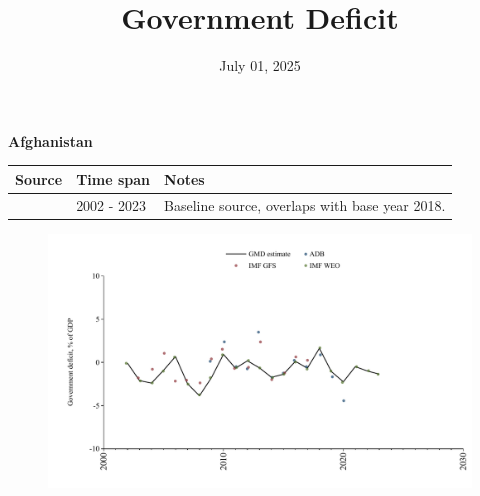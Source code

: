 \documentclass[12pt,a4paper,landscape]{article}
\begin{document}
\title{\Large Government Deficit}
\date{July 01, 2025}
\maketitle
\thispagestyle{empty}

\clearpage
\setcounter{page}{1}
\hypersetup{colorlinks=true,linkcolor=blue,linktoc=all}
\label{toc}
\tableofcontents
\thispagestyle{empty}
\setcounter{page}{3}
\begin{adjustbox}{max totalsize={\paperwidth}{\paperheight},center}
\begin{minipage}[t][\textheight][t]{\textwidth}
\vspace*{0.5cm}
{}
\begin{center}
{\Large\bfseries Afghanistan}
\end{center}
\vspace{0.5cm}
\begin{table}[H]
\centering
\small
\begin{tabular}{|l|l|l|}
\hline
\textbf{Source} & \textbf{Time span} & \textbf{Notes} \\
\hline
\rowcolor{white}\cite{IMF_WEO}& 2002 - 2023 &Baseline source, overlaps with base year 2018.\\
\hline
\end{tabular}
\end{table}
\begin{figure}[H]
\centering
\includegraphics[width=\textwidth,height=0.6\textheight,keepaspectratio]{graphs/AFG_govdef_GDP.pdf}
\end{figure}
\end{minipage}
\end{adjustbox}
\end{document}
